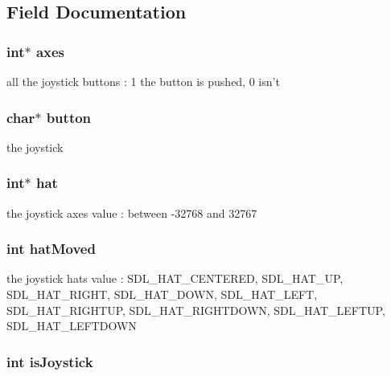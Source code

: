 \subsection{Field Documentation}
\hypertarget{struct_input_ae2fe71f7c5edeaa9fc2676be4a93499a}{
\subsubsection[{axes}]{\setlength{\rightskip}{0pt plus 5cm}int$\ast$ axes}}\label{struct_input_ae2fe71f7c5edeaa9fc2676be4a93499a}
all the joystick buttons \-: 1 the button is pushed, 0 isn't \hypertarget{struct_input_a7f901d4dc1179ea534cb9e5cce0a260b}{
\subsubsection[{button}]{\setlength{\rightskip}{0pt plus 5cm}char$\ast$ button}}\label{struct_input_a7f901d4dc1179ea534cb9e5cce0a260b}
the joystick \hypertarget{struct_input_ab1c8c264ad7cfee584093b1479c03f75}{
\subsubsection[{hat}]{\setlength{\rightskip}{0pt plus 5cm}int$\ast$ hat}}\label{struct_input_ab1c8c264ad7cfee584093b1479c03f75}
the joystick axes value \-: between -\/32768 and 32767 \hypertarget{struct_input_af7cf3c53ae2105eec18ce989dd3ddae0}{
\subsubsection[{hat\-Moved}]{\setlength{\rightskip}{0pt plus 5cm}int hat\-Moved}}\label{struct_input_af7cf3c53ae2105eec18ce989dd3ddae0}
the joystick hats value \-: S\-D\-L\-\_\-\-H\-A\-T\-\_\-\-C\-E\-N\-T\-E\-R\-E\-D, S\-D\-L\-\_\-\-H\-A\-T\-\_\-\-U\-P, S\-D\-L\-\_\-\-H\-A\-T\-\_\-\-R\-I\-G\-H\-T, S\-D\-L\-\_\-\-H\-A\-T\-\_\-\-D\-O\-W\-N, S\-D\-L\-\_\-\-H\-A\-T\-\_\-\-L\-E\-F\-T, S\-D\-L\-\_\-\-H\-A\-T\-\_\-\-R\-I\-G\-H\-T\-U\-P, S\-D\-L\-\_\-\-H\-A\-T\-\_\-\-R\-I\-G\-H\-T\-D\-O\-W\-N, S\-D\-L\-\_\-\-H\-A\-T\-\_\-\-L\-E\-F\-T\-U\-P, S\-D\-L\-\_\-\-H\-A\-T\-\_\-\-L\-E\-F\-T\-D\-O\-W\-N \hypertarget{struct_input_a163e08d0d19093f658f448710f8e3c49}{
\subsubsection[{is\-Joystick}]{\setlength{\rightskip}{0pt plus 5cm}int is\-Joystick}}\label{struct_input_a163e08d0d19093f658f448710f8e3c49}
